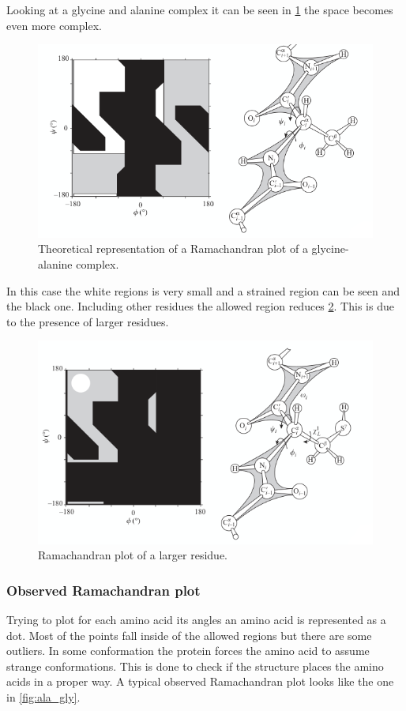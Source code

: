 		Looking at a glycine and alanine complex it can be seen in \ref{fig:ala_gly-theo} the space becomes even more complex.

	\begin{figure}[H]
		\centering
		\includegraphics[scale = 0.3]{ala-gly-theo.png}
		\caption{Theoretical representation of a Ramachandran plot of a glycine-alanine complex.}
		\label{fig:ala_gly-theo}
	\end{figure}

	In this case the white regions is very small and a strained region can be seen and the black one.
	Including other residues the allowed region reduces \ref{fig:ramachandran-final}.
	This is due to the presence of larger residues.

	\begin{figure}[H]
		\centering
		\includegraphics[scale = 0.3]{ramachandran-final.png}
		\caption{Ramachandran plot of a larger residue.}
		\label{fig:ramachandran-final}
	\end{figure}

		\subsubsection{Observed Ramachandran plot}
		Trying to plot for each amino acid its angles an amino acid is represented as a dot.
		Most of the points fall inside of the allowed regions but there are some outliers.
		In some conformation the protein forces the amino acid to assume strange conformations.
		This is done to check if the structure places the amino acids in a proper way.
		A typical observed Ramachandran plot looks like the one in \ref{fig:ala_gly}.

